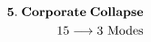 \documentclass[preview]{standalone}
\begin{document}
\begin{align*}
\special{dvisvgm:raw <g id='unique000'>}\mathbf{5.\;Corporate\;Collapse}\\15\longrightarrow 3\text{ Modes}\special{dvisvgm:raw </g>}
\end{align*}
\end{document}
